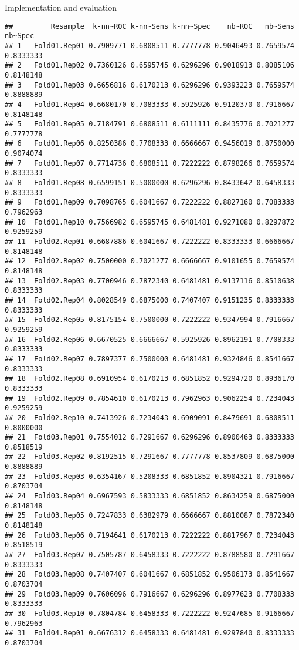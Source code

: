 \documentclass[
  ignorenonframetext,
]{beamer}
\begin{document}
\begin{frame}[fragile]{Implementation and evaluation}
\begin{verbatim}
##         Resample  k-nn~ROC k-nn~Sens k-nn~Spec    nb~ROC   nb~Sens   nb~Spec
## 1   Fold01.Rep01 0.7909771 0.6808511 0.7777778 0.9046493 0.7659574 0.8333333
## 2   Fold01.Rep02 0.7360126 0.6595745 0.6296296 0.9018913 0.8085106 0.8148148
## 3   Fold01.Rep03 0.6656816 0.6170213 0.6296296 0.9393223 0.7659574 0.8888889
## 4   Fold01.Rep04 0.6680170 0.7083333 0.5925926 0.9120370 0.7916667 0.8148148
## 5   Fold01.Rep05 0.7184791 0.6808511 0.6111111 0.8435776 0.7021277 0.7777778
## 6   Fold01.Rep06 0.8250386 0.7708333 0.6666667 0.9456019 0.8750000 0.9074074
## 7   Fold01.Rep07 0.7714736 0.6808511 0.7222222 0.8798266 0.7659574 0.8333333
## 8   Fold01.Rep08 0.6599151 0.5000000 0.6296296 0.8433642 0.6458333 0.8333333
## 9   Fold01.Rep09 0.7098765 0.6041667 0.7222222 0.8827160 0.7083333 0.7962963
## 10  Fold01.Rep10 0.7566982 0.6595745 0.6481481 0.9271080 0.8297872 0.9259259
## 11  Fold02.Rep01 0.6687886 0.6041667 0.7222222 0.8333333 0.6666667 0.8148148
## 12  Fold02.Rep02 0.7500000 0.7021277 0.6666667 0.9101655 0.7659574 0.8148148
## 13  Fold02.Rep03 0.7700946 0.7872340 0.6481481 0.9137116 0.8510638 0.8333333
## 14  Fold02.Rep04 0.8028549 0.6875000 0.7407407 0.9151235 0.8333333 0.8333333
## 15  Fold02.Rep05 0.8175154 0.7500000 0.7222222 0.9347994 0.7916667 0.9259259
## 16  Fold02.Rep06 0.6670525 0.6666667 0.5925926 0.8962191 0.7708333 0.8333333
## 17  Fold02.Rep07 0.7897377 0.7500000 0.6481481 0.9324846 0.8541667 0.8333333
## 18  Fold02.Rep08 0.6910954 0.6170213 0.6851852 0.9294720 0.8936170 0.8333333
## 19  Fold02.Rep09 0.7854610 0.6170213 0.7962963 0.9062254 0.7234043 0.9259259
## 20  Fold02.Rep10 0.7413926 0.7234043 0.6909091 0.8479691 0.6808511 0.8000000
## 21  Fold03.Rep01 0.7554012 0.7291667 0.6296296 0.8900463 0.8333333 0.8518519
## 22  Fold03.Rep02 0.8192515 0.7291667 0.7777778 0.8537809 0.6875000 0.8888889
## 23  Fold03.Rep03 0.6354167 0.5208333 0.6851852 0.8904321 0.7916667 0.8703704
## 24  Fold03.Rep04 0.6967593 0.5833333 0.6851852 0.8634259 0.6875000 0.8148148
## 25  Fold03.Rep05 0.7247833 0.6382979 0.6666667 0.8810087 0.7872340 0.8148148
## 26  Fold03.Rep06 0.7194641 0.6170213 0.7222222 0.8817967 0.7234043 0.8518519
## 27  Fold03.Rep07 0.7505787 0.6458333 0.7222222 0.8788580 0.7291667 0.8333333
## 28  Fold03.Rep08 0.7407407 0.6041667 0.6851852 0.9506173 0.8541667 0.8703704
## 29  Fold03.Rep09 0.7606096 0.7916667 0.6296296 0.8977623 0.7708333 0.8333333
## 30  Fold03.Rep10 0.7804784 0.6458333 0.7222222 0.9247685 0.9166667 0.7962963
## 31  Fold04.Rep01 0.6676312 0.6458333 0.6481481 0.9297840 0.8333333 0.8703704

\end{verbatim}
\end{frame}
\end{document}
